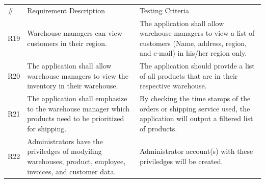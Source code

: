 \documentclass[12pt]{article}
\begin{document}
\begin{myspace}{1.7}
\begin{table}[]
\centering
\label{my-label}
\begin{tabular}{| p{.5cm}|p{9cm} |p{5cm}|}
\#  & Requirement Description                                                                                                                                                                                                                                                                                & Testing Criteria                                                                                                                                                                                                                                                               \\
R19 & Warehouse managers can view customers in their region.                                                                                                                                                                                                                                                 & The application shall allow warehouse managers to view a list of customers (Name, address, region, and e-mail) in his/her region only.                                                                                                                                       \\
R20 & The application shall allow warehouse managers to view the inventory in their warehouse.                                                                                                                                                                                                               & The application should provide a list of all products that are in their respective warehouse.                                                                                                                                                                                \\
R21 & The application shall emphasize to the warehouse manager which products need to be prioritized for shipping.                                                                                                                                                                                           & By checking the time stamps of the orders or shipping service used, the application will output a filtered list of products.                                                                                                                                                 \\
R22 & Administrators have the priviledges of modyifing warehouses, product, employee, invoices, and customer data.                                                                                                                                                                                           & Administrator account(s) with these priviledges will be created.                                                                                                                                                                                                            
\end{tabular}
\end{table}


\end{myspace}
\end{document}

